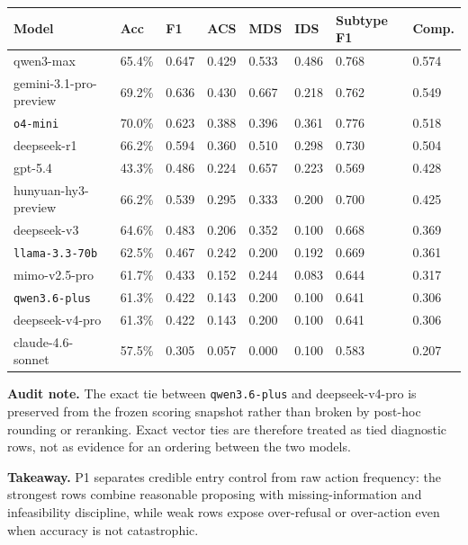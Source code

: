\begin{center}
\label{tab:appendix_p1_full}
\scriptsize
\setlength{\tabcolsep}{3.5pt}
\renewcommand{\arraystretch}{1.08}
\begin{tabular}{llllllll}
\toprule
Model & Acc & F1 & ACS & MDS & IDS & Subtype F1 & Comp. \\
\midrule
qwen3-max & 65.4\% & 0.647 & 0.429 & 0.533 & 0.486 & 0.768 & 0.574 \\
gemini-3.1-pro-preview & 69.2\% & 0.636 & 0.430 & 0.667 & 0.218 & 0.762 & 0.549 \\
\texttt{o4-mini} & 70.0\% & 0.623 & 0.388 & 0.396 & 0.361 & 0.776 & 0.518 \\
deepseek-r1 & 66.2\% & 0.594 & 0.360 & 0.510 & 0.298 & 0.730 & 0.504 \\
gpt-5.4 & 43.3\% & 0.486 & 0.224 & 0.657 & 0.223 & 0.569 & 0.428 \\
hunyuan-hy3-preview & 66.2\% & 0.539 & 0.295 & 0.333 & 0.200 & 0.700 & 0.425 \\
deepseek-v3 & 64.6\% & 0.483 & 0.206 & 0.352 & 0.100 & 0.668 & 0.369 \\
\texttt{llama-3.3-70b} & 62.5\% & 0.467 & 0.242 & 0.200 & 0.192 & 0.669 & 0.361 \\
mimo-v2.5-pro & 61.7\% & 0.433 & 0.152 & 0.244 & 0.083 & 0.644 & 0.317 \\
\texttt{qwen3.6-plus} & 61.3\% & 0.422 & 0.143 & 0.200 & 0.100 & 0.641 & 0.306 \\
deepseek-v4-pro & 61.3\% & 0.422 & 0.143 & 0.200 & 0.100 & 0.641 & 0.306 \\
claude-4.6-sonnet & 57.5\% & 0.305 & 0.057 & 0.000 & 0.100 & 0.583 & 0.207 \\
\bottomrule
\end{tabular}
\end{center}

\noindent\textbf{Audit note.} The exact tie between \texttt{qwen3.6-plus} and deepseek-v4-pro is preserved from the frozen scoring snapshot rather than broken by post-hoc rounding or reranking. Exact vector ties are therefore treated as tied diagnostic rows, not as evidence for an ordering between the two models.

\noindent\textbf{Takeaway.} P1 separates credible entry control from raw action frequency: the strongest rows combine reasonable proposing with missing-information and infeasibility discipline, while weak rows expose over-refusal or over-action even when accuracy is not catastrophic.

